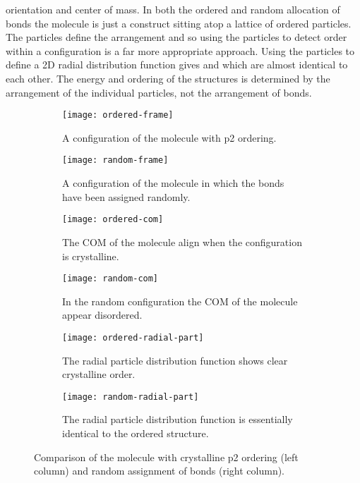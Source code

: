 orientation and center of mass. In both the ordered and random allocation of bonds the molecule is just a construct sitting atop a lattice of ordered particles. The particles define the arrangement and so using the particles to detect order within a configuration is a far more appropriate approach. Using the particles to define a 2D radial distribution function gives  and  which are almost identical to each other. The energy and ordering of the structures is determined by the arrangement of the individual particles, not the arrangement of bonds.

\begin{figure}
    \begin{subfigure}[t]{0.5\linewidth}
        \texttt{[image: ordered-frame]}
        \caption{A configuration of the \dcon molecule with p2 ordering.}
        \label{fig:ordered frame}
    \end{subfigure}
    \begin{subfigure}[t]{0.5\linewidth}
        \texttt{[image: random-frame]}
        \caption{A configuration of the \dcon molecule in which the bonds have been assigned randomly.}
        \label{fig:random frame}
    \end{subfigure}
    \begin{subfigure}[t]{0.5\linewidth}
        \texttt{[image: ordered-com]}
        \caption{The COM of the \dcon molecule align when the configuration is crystalline.}
        \label{fig:ordered com}
    \end{subfigure}
    \begin{subfigure}[t]{0.5\linewidth}
        \texttt{[image: random-com]}
        \caption{In the random configuration the COM of the \dcon molecule appear disordered.}
        \label{fig:random com}
    \end{subfigure}
    \begin{subfigure}[t]{0.5\linewidth}
        \texttt{[image: ordered-radial-part]}
        \caption{The radial particle distribution function shows clear crystalline order.}
        \label{fig:ordered radial part}
    \end{subfigure}
    \begin{subfigure}[t]{0.5\linewidth}
        \texttt{[image: random-radial-part]}
        \caption{The radial particle distribution function is essentially identical to the ordered structure.}
        \label{fig:random radial part}
    \end{subfigure}
    \caption{Comparison of the \scon molecule with crystalline p2 ordering (left column) and random assignment of bonds (right column).}
    \label{fig:compact bonds}
\end{figure}


